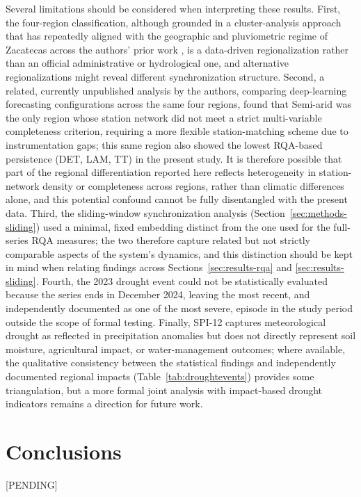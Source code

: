 \documentclass[climate,article,submit,moreauthors]{Definitions/mdpi}
\begin{document}
Several limitations should be considered when interpreting these results.
First, the four-region classification, although grounded in a
cluster-analysis approach that has repeatedly aligned with the geographic
and pluviometric regime of Zacatecas across the authors' prior work
\cite{magallanes2019,magallanes2022,magallanes2023,magallanes2024a,magallanes2024b,magallanes2026forecasting,magallanes2026agrociencia},
is a data-driven regionalization rather than an official administrative or
hydrological one, and alternative regionalizations might reveal different
synchronization structure. Second, a related, currently unpublished analysis
by the authors, comparing deep-learning forecasting configurations across
the same four regions, found that Semi-arid was the only region whose
station network did not meet a strict multi-variable completeness
criterion, requiring a more flexible station-matching scheme due to
instrumentation gaps; this same region also showed the lowest RQA-based
persistence (DET, LAM, TT) in the present study. It is therefore possible
that part of the regional differentiation reported here reflects
heterogeneity in station-network density or completeness across regions,
rather than climatic differences alone, and this potential confound cannot
be fully disentangled with the present data. Third, the sliding-window
synchronization
analysis (Section~\ref{sec:methods-sliding}) used a minimal, fixed embedding
distinct from the one used for the full-series RQA measures; the two
therefore capture related but not strictly comparable aspects of the
system's dynamics, and this distinction should be kept in mind when relating
findings across Sections~\ref{sec:results-rqa} and
\ref{sec:results-sliding}. Fourth, the 2023 drought event could not be
statistically evaluated because the series ends in December 2024, leaving
the most recent, and independently documented as one of the most severe,
episode in the study period outside the scope of formal testing. Finally,
SPI-12 captures meteorological drought as reflected in precipitation
anomalies but does not directly represent soil moisture, agricultural
impact, or water-management outcomes; where available, the qualitative
consistency between the statistical findings and independently documented
regional impacts (Table~\ref{tab:droughtevents}) provides some
triangulation, but a more formal joint analysis with impact-based drought
indicators remains a direction for future work.

\section{Conclusions}
\label{sec:conclusions}
[PENDING]
\end{document}
